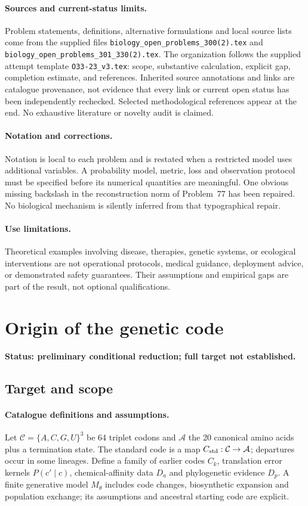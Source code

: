 \documentclass[11pt]{article}
\begin{document}
\paragraph{Sources and current-status limits.}
Problem statements, definitions, alternative formulations and local source lists
come from the supplied files
\texttt{biology\_open\_problems\_300(2).tex} and
\texttt{biology\_open\_problems\_301\_330(2).tex}.
The organization follows the supplied attempt template
\texttt{O33-23\_v3.tex}: scope, substantive calculation, explicit gap,
completion estimate, and references. Inherited source annotations and links are
catalogue provenance, not evidence that every link or current open status has
been independently rechecked. Selected methodological references appear at the
end. No exhaustive literature or novelty audit is claimed.

\paragraph{Notation and corrections.}
Notation is local to each problem and is restated when a restricted model uses
additional variables. A probability model, metric, loss and observation protocol
must be specified before its numerical quantities are meaningful. One obvious
missing backslash in the reconstruction norm of Problem~77 has been repaired.
No biological mechanism is silently inferred from that typographical repair.

\paragraph{Use limitations.}
Theoretical examples involving disease, therapies, genetic systems, or ecological
interventions are not operational protocols, medical guidance, deployment advice,
or demonstrated safety guarantees. Their assumptions and empirical gaps are part
of the result, not optional qualifications.


\section*{Origin of the genetic code}
\label{prob:288}
\noindent\textbf{Status: preliminary conditional reduction; full target not established.}
\subsection{Target and scope}
\paragraph{Catalogue definitions and assumptions.}
Let $\mathcal C=\{A,C,G,U\}^3$ be 64 triplet codons and $\mathcal A$ the 20 canonical amino acids plus a termination state. The standard code is a map $C_{\rm std}:\mathcal C\to\mathcal A$; departures occur in some lineages. Define a family of earlier codes $C_k$, translation error kernels $P(c'\mid c)$, chemical-affinity data $D_a$ and phylogenetic evidence $D_p$. A finite generative model $M_\theta$ includes code changes, biosynthetic expansion and population exchange; its assumptions and ancestral starting code are explicit.
\end{document}
